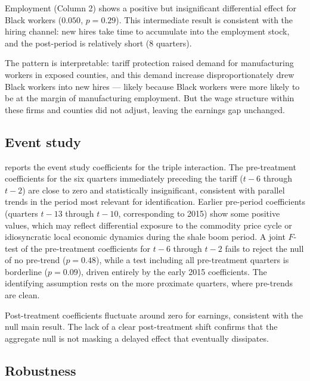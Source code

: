 \documentclass[12pt]{article}
\begin{document}
Employment (Column 2) shows a positive but insignificant differential effect for Black workers ($0.050$, $p = 0.29$). This intermediate result is consistent with the hiring channel: new hires take time to accumulate into the employment stock, and the post-period is relatively short (8 quarters).

The pattern is interpretable: tariff protection raised demand for manufacturing workers in exposed counties, and this demand increase disproportionately drew Black workers into new hires --- likely because Black workers were more likely to be at the margin of manufacturing employment. But the wage structure within these firms and counties did not adjust, leaving the earnings gap unchanged.

\subsection{Event study}



 reports the event study coefficients for the triple interaction. The pre-treatment coefficients for the six quarters immediately preceding the tariff ($t-6$ through $t-2$) are close to zero and statistically insignificant, consistent with parallel trends in the period most relevant for identification. Earlier pre-period coefficients (quarters $t-13$ through $t-10$, corresponding to 2015) show some positive values, which may reflect differential exposure to the commodity price cycle or idiosyncratic local economic dynamics during the shale boom period. A joint $F$-test of the pre-treatment coefficients for $t-6$ through $t-2$ fails to reject the null of no pre-trend ($p = 0.48$), while a test including all pre-treatment quarters is borderline ($p = 0.09$), driven entirely by the early 2015 coefficients. The identifying assumption rests on the more proximate quarters, where pre-trends are clean.

Post-treatment coefficients fluctuate around zero for earnings, consistent with the null main result. The lack of a clear post-treatment shift confirms that the aggregate null is not masking a delayed effect that eventually dissipates.

\subsection{Robustness}


\end{document}
